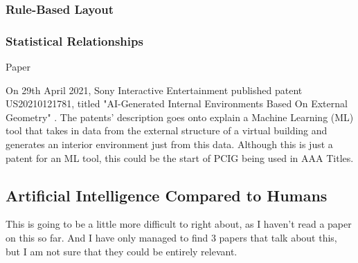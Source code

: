 \subsubsection*{Rule-Based Layout}

\subsubsection*{Statistical Relationships}
Paper \cite{make-it-home}

\bigskip
On 29th April 2021, Sony Interactive Entertainment published patent US20210121781, 
titled "AI-Generated Internal Environments Based On External Geometry" \cite{sony-patent}.
The patents' description goes onto explain a 
Machine Learning (ML) tool that takes in data from the external structure of a virtual building
and generates an interior environment just from this data.
Although this is just a patent for an ML tool, this could be the start of PCIG being used in AAA Titles. 
\subsection{Artificial Intelligence Compared to Humans}
This is going to be a little more difficult to right about, as I haven't read a paper on this so far.
And I have only managed to find 3 papers that talk about this, but I am not sure that they could be entirely relevant.